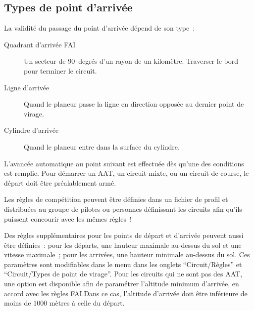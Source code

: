 \subsection*{Types de point d'arrivée}
La validité du passage du point d'arrivée dépend de son type~:
\begin{description}
\item[Quadrant d'arrivée FAI] Un secteur de 90~degrés d'un rayon de un kilomètre. Traverser le bord pour terminer le circuit.
\item[Ligne d'arrivée] Quand le planeur passe la ligne en direction opposée au dernier point de virage.
\item[Cylindre d'arrivée] Quand le planeur entre dans la surface du cylindre.
\end{description}

L'avancée automatique au point suivant est effectuée dès qu'une des conditions est remplie. Pour démarrer un AAT, un circuit mixte, ou un circuit de course, le départ doit être préalablement armé.

\tip{} Les règles de compétition peuvent être définies dans un fichier de profil et distribuées au groupe de pilotes ou personnes définissant les circuits afin qu'ils puissent concourir avec les mêmes règles~!

Des règles supplémentaires pour les points de départ et d'arrivée peuvent aussi être définies~:  pour les départs, une hauteur maximale au-dessus du sol et une vitesse maximale~; pour les arrivées, une hauteur minimale au-dessus du sol. Ces paramètres sont modifiables dans le menu \blink{} dans les onglets ``Circuit/Règles'' et ``Circuit/Types de point de virage''.
Pour les circuits qui ne sont pas des AAT, une option est disponible afin de paramétrer l'altitude minimum d'arrivée, en accord avec les règles FAI.\@ Dans ce cas, l'altitude d'arrivée doit être inférieure de moins de 1000 mètres à celle du départ.

